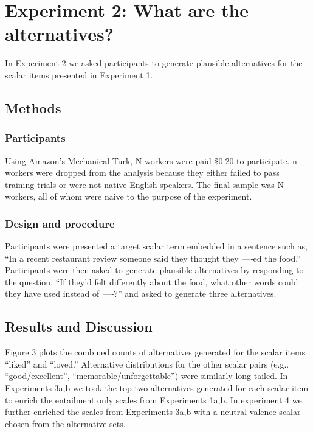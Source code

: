 \documentclass[10pt, letterpaper]{article}
\begin{document}
\section{Experiment 2: What are the
alternatives?}\label{experiment-2-what-are-the-alternatives}

In Experiment 2 we asked participants to generate plausible alternatives
for the scalar items presented in Experiment 1.

\subsection{Methods}\label{methods-1}

\subsubsection{Participants}\label{participants-1}

Using Amazon's Mechanical Turk, N workers were paid \$0.20 to
participate. n workers were dropped from the analysis because they
either failed to pass training trials or were not native English
speakers. The final sample was N workers, all of whom were naive to the
purpose of the experiment.

\subsubsection{Design and procedure}\label{design-and-procedure-1}

Participants were presented a target scalar term embedded in a sentence
such as, ``In a recent restaurant review someone said they thought they
\emph{----}ed the food.'' Participants were then asked to generate
plausible alternatives by responding to the question, ``If they'd felt
differently about the food, what other words could they have used
instead of \emph{----}?'' and asked to generate three alternatives.

\subsection{Results and Discussion}\label{results-and-discussion-1}

Figure 3 plots the combined counts of alternatives generated for the
scalar items ``liked'' and ``loved.'' Alternative distributions for the
other scalar pairs (e.g.. ``good/excellent'',
``memorable/unforgettable'') were similarly long-tailed. In Experiments
3a,b we took the top two alternatives generated for each scalar item to
enrich the entailment only scales from Experiments 1a,b. In experiment 4
we further enriched the scales from Experiments 3a,b with a neutral
valence scalar chosen from the alternative sets.
\end{document}
